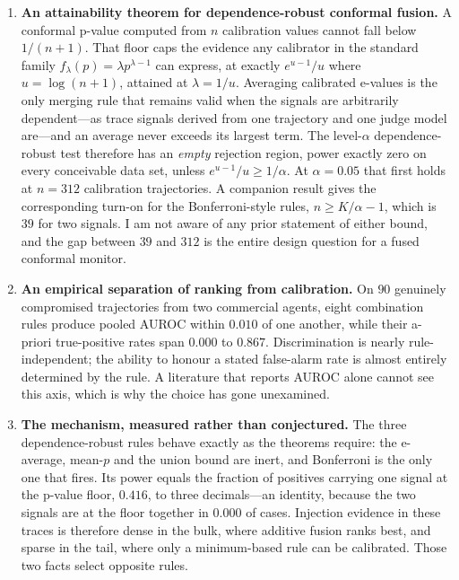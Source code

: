 \documentclass[10pt]{article}
\begin{document}
\begin{enumerate}[leftmargin=1.4em,itemsep=0.3em]
\item \textbf{An attainability theorem for dependence-robust conformal fusion.} A
conformal p-value computed from $n$ calibration values cannot fall below
$1/(n{+}1)$. That floor caps the evidence any calibrator in the standard family
$f_\lambda(p) = \lambda p^{\lambda-1}$ can express, at exactly $e^{u-1}/u$ where
$u = \log(n{+}1)$, attained at $\lambda = 1/u$. Averaging calibrated e-values is
the only merging rule that remains valid when the signals are arbitrarily
dependent---as trace signals derived from one trajectory and one judge model
are---and an average never exceeds its largest term. The level-$\alpha$
dependence-robust test therefore has an \emph{empty} rejection region, power
exactly zero on every conceivable data set, unless $e^{u-1}/u \ge 1/\alpha$. At
$\alpha = 0.05$ that first holds at $n = 312$ calibration trajectories. A companion
result gives the corresponding turn-on for the Bonferroni-style rules,
$n \ge K/\alpha - 1$, which is $39$ for two signals. I am not aware of any prior
statement of either bound, and the gap between $39$ and $312$ is the entire design
question for a fused conformal monitor.

\item \textbf{An empirical separation of ranking from calibration.} On $90$
genuinely compromised trajectories from two commercial agents, eight combination
rules produce pooled AUROC within $0.010$ of one another, while their a-priori
true-positive rates span $0.000$ to $0.867$. Discrimination is nearly
rule-independent; the ability to honour a stated false-alarm rate is almost
entirely determined by the rule. A literature that reports AUROC alone cannot see
this axis, which is why the choice has gone unexamined.

\item \textbf{The mechanism, measured rather than conjectured.} The three
dependence-robust rules behave exactly as the theorems require: the e-average,
mean-$p$ and the union bound are inert, and Bonferroni is the only one that fires.
Its power equals the fraction of positives carrying one signal at the p-value
floor, $0.416$, to three decimals---an identity, because the two signals are at the
floor together in $0.000$ of cases. Injection evidence in these traces is therefore
dense in the bulk, where additive fusion ranks best, and sparse in the tail, where
only a minimum-based rule can be calibrated. Those two facts select opposite rules.


\end{enumerate}
\end{document}
